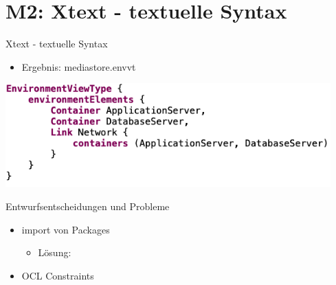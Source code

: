 \section[M2: Xtext]{M2: Xtext - textuelle Syntax}
\begin{frame}{Xtext - textuelle Syntax}
    \begin{itemize}
        \item Ergebnis: mediastore.envvt
    \end{itemize}
	\vspace{1mm}
    \centering
	\includegraphics[height=40mm]{figures/xtext.png}
\end{frame}

\begin{frame}{Entwurfsentscheidungen und Probleme}
	\begin{itemize}
		\item import von Packages
		\begin{itemize}
            \item Lösung:
        \end{itemize}
        \item OCL Constraints
	\end{itemize}
\end{frame}